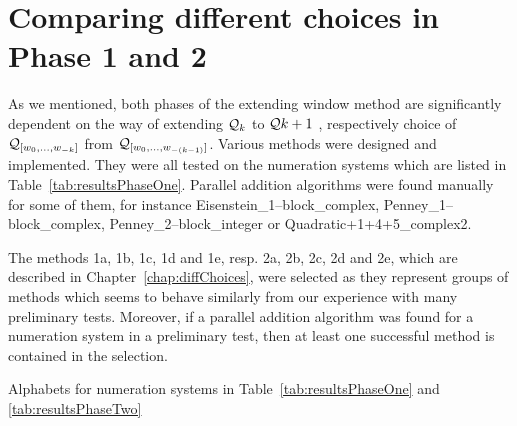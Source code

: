 

\section{Comparing different choices in Phase 1 and 2}
\label{sec:compareMethods}

As we mentioned, both phases of the extending window method are significantly dependent on the way of extending $\mathcal{Q}_k$ to $\mathcal{Q}{k+1}$ , respectively choice of $\mathcal{Q}_{[w_{0}, \dots, w_{-k}]}$ from $\mathcal{Q}_{[w_{0}, \dots, w_{-(k-1)}]}$. Various methods were designed and implemented. They were all tested on the numeration systems which are listed in Table~\ref{tab:resultsPhaseOne}. Parallel addition algorithms were found manually~\cite{milena} for some of them, for instance Eisenstein\_1--block\_complex, Penney\_1--block\_complex, Penney\_2--block\_integer or Quadratic+1+4+5\_complex2. 

The methods 1a, 1b, 1c, 1d and 1e, resp. 2a, 2b, 2c, 2d and 2e, which are described in Chapter~\ref{chap:diffChoices}, were selected as they represent groups of methods which seems to behave similarly from our experience with many preliminary tests. Moreover, if a parallel addition algorithm was found for a numeration system in a preliminary test, then at least one successful method is contained in the selection.



\begin{table}[htb]
	\begin{center}
	
	\end{center}
\caption{Alphabets for numeration systems in Table~\ref{tab:resultsPhaseOne} and \ref{tab:resultsPhaseTwo}}
\label{tab:alphabets}
\end{table}





